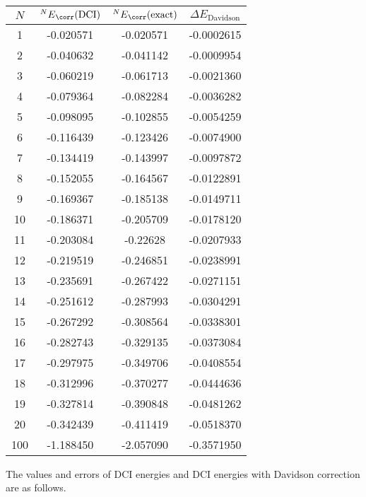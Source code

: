 \documentclass[a4paper]{article}
\begin{document}
\begin{table}[H]
	\begin{tabular}{cccc}
	\hline
	\specialrule{0em}{1pt}{2pt}
	$ N $ & $ {^N E}_{\corr}(\text{DCI}) $ & $ {^N E}_{\corr}(\text{exact}) $ & $ \Delta E_{\text{Davidson}} $  \\ \hline
    1 & -0.020571	& -0.020571 &  -0.0002615 \\
    2 & -0.040632	& -0.041142 &  -0.0009954 \\
    3 & -0.060219	& -0.061713 &  -0.0021360	 \\
    4 & -0.079364	& -0.082284 &  -0.0036282	 \\
    5 & -0.098095	& -0.102855	 & -0.0054259	 \\
    6 & -0.116439	& -0.123426	 & -0.0074900	 \\
    7 & -0.134419	& -0.143997	 & -0.0097872	 \\
    8 & -0.152055	& -0.164567	 & -0.0122891	 \\
    9 & -0.169367	& -0.185138	 & -0.0149711	 \\
    10 & -0.186371	& -0.205709	 & -0.0178120	 \\
    11 & -0.203084	& -0.22628	 & -0.0207933	 \\
    12 & -0.219519	& -0.246851	 & -0.0238991	 \\
    13 & -0.235691	& -0.267422	 & -0.0271151	 \\
    14 & -0.251612	& -0.287993	 & -0.0304291	 \\
    15 & -0.267292	& -0.308564	 & -0.0338301	 \\
    16 & -0.282743	& -0.329135	 & -0.0373084	 \\
    17 & -0.297975	& -0.349706	 & -0.0408554	 \\
    18 & -0.312996	& -0.370277	 & -0.0444636	 \\
    19 & -0.327814	& -0.390848	 & -0.0481262	 \\
    20 & -0.342439	& -0.411419	 & -0.0518370	 \\
    100 & -1.188450 & -2.057090  & -0.3571950 \\ 
    \hline
	\end{tabular}
\end{table}
The values and errors of DCI energies and DCI energies with Davidson correction are as follows.
\end{document}
